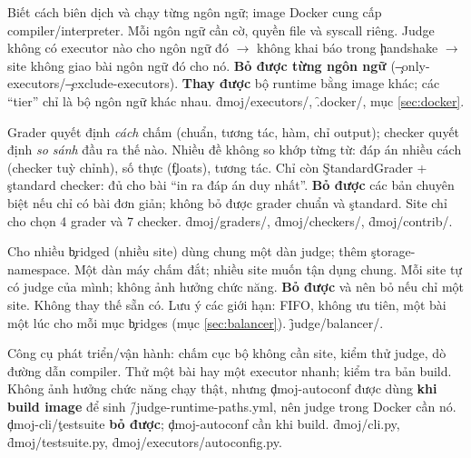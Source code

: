 {Biết cách biên dịch và chạy từng ngôn ngữ; image Docker cung cấp compiler/interpreter.}
{Mỗi ngôn ngữ cần cờ, quyền file và syscall riêng.}
{Judge không có executor nào cho ngôn ngữ đó $\to$ không khai báo trong \c{handshake} $\to$ site không giao bài ngôn ngữ đó cho nó.}
{\textbf{Bỏ được từng ngôn ngữ} (\c{--only-executors}/\c{--exclude-executors}). \textbf{Thay được} bộ runtime bằng image khác; các ``tier'' chỉ là bộ ngôn ngữ khác nhau.}
{\f{dmoj/executors/}, \f{.docker/}, mục \ref{sec:docker}.}

{Grader quyết định \emph{cách} chấm (chuẩn, tương tác, hàm, chỉ output); checker quyết định \emph{so sánh} đầu ra thế nào.}
{Nhiều đề không so khớp từng từ: đáp án nhiều cách (checker tuỳ chỉnh), số thực (\c{floats}), tương tác.}
{Chỉ còn \c{StandardGrader} + \c{standard} checker: đủ cho bài ``in ra đáp án duy nhất''.}
{\textbf{Bỏ được} các bản chuyên biệt nếu chỉ có bài đơn giản; không bỏ được grader chuẩn và \c{standard}. Site chỉ cho chọn 4 grader và 7 checker.}
{\f{dmoj/graders/}, \f{dmoj/checkers/}, \f{dmoj/contrib/}.}

{Cho nhiều \c{bridged} (nhiều site) dùng chung một dàn judge; thêm \c{storage-namespace}.}
{Một dàn máy chấm đắt; nhiều site muốn tận dụng chung.}
{Mỗi site tự có judge của mình; không ảnh hưởng chức năng.}
{\textbf{Bỏ được} và nên bỏ nếu chỉ một site. Không thay thế sẵn có. Lưu ý các giới hạn: FIFO, không ưu tiên, một bài một lúc cho mỗi mục \c{bridges} (mục \ref{sec:balancer}).}
{\f{judge/balancer/}.}

{Công cụ phát triển/vận hành: chấm cục bộ không cần site, kiểm thử judge, dò đường dẫn compiler.}
{Thử một bài hay một executor nhanh; kiểm tra bản build.}
{Không ảnh hưởng chức năng chạy thật, nhưng \c{dmoj-autoconf} được dùng \textbf{khi build image} để sinh \f{/judge-runtime-paths.yml}, nên judge trong Docker cần nó.}
{\c{dmoj-cli}/\c{testsuite} \textbf{bỏ được}; \c{dmoj-autoconf} cần khi build.}
{\f{dmoj/cli.py}, \f{dmoj/testsuite.py}, \f{dmoj/executors/autoconfig.py}.}

